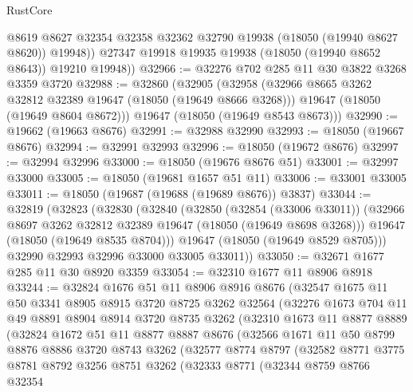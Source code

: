 \begin{lexlean}{RustCore}
\begin{coremodule}
            @8619
            @8627
            @32354
            @32358
            @32362
            @32790
            @19938
            (@18050 (@19940 @8627 @8620))
            @19948))
        @27347
        @19918
        @19935
        @19938
        (@18050 (@19940 @8652 @8643))
        @19210
        @19948))
@32966 := @32276 @702 @285 @11 @30 @3822 @3268 @3359 @3720
@32988 := @32860
    (@32905
      (@32958
        (@32966 @8665 @3262 @32812 @32389 @19647 (@18050 (@19649 @8666 @3268)))
        @19647
        (@18050 (@19649 @8604 @8672)))
      @19647
      (@18050 (@19649 @8543 @8673)))
@32990 := @19662 (@19663 @8676)
@32991 := @32988 @32990
@32993 := @18050 (@19667 @8676)
@32994 := @32991 @32993
@32996 := @18050 (@19672 @8676)
@32997 := @32994 @32996
@33000 := @18050 (@19676 @8676 @51)
@33001 := @32997 @33000
@33005 := @18050 (@19681 @1657 @51 @11)
@33006 := @33001 @33005
@33011 := @18050 (@19687 (@19688 (@19689 @8676)) @3837)
@33044 := @32819
    (@32823
      (@32830
        (@32840
          (@32850
            (@32854 (@33006 @33011))
            (@32966 @8697 @3262 @32812 @32389 @19647 (@18050 (@19649 @8698 @3268)))
            @19647
            (@18050 (@19649 @8535 @8704)))
          @19647
          (@18050 (@19649 @8529 @8705)))
        @32990
        @32993
        @32996
        @33000
        @33005
        @33011))
@33050 := @32671 @1677 @285 @11 @30 @8920 @3359
@33054 := @32310 @1677 @11 @8906 @8918
@33244 := @32824
    @1676
    @51
    @11
    @8906
    @8916
    @8676
    (@32547
      @1675
      @11
      @50
      @3341
      @8905
      @8915
      @3720
      @8725
      @3262
      @32564
      (@32276
        @1673
        @704
        @11
        @49
        @8891
        @8904
        @8914
        @3720
        @8735
        @3262
        (@32310
          @1673
          @11
          @8877
          @8889
          (@32824
            @1672
            @51
            @11
            @8877
            @8887
            @8676
            (@32566
              @1671
              @11
              @50
              @8799
              @8876
              @8886
              @3720
              @8743
              @3262
              (@32577
                @8774
                @8797
                (@32582
                  @8771
                  @3775
                  @8781
                  @8792
                  @3256
                  @8751
                  @3262
                  (@32333
                    @8771
                    (@32344
                      @8759
                      @8766
                      @32354

\end{coremodule}
\end{lexlean}
